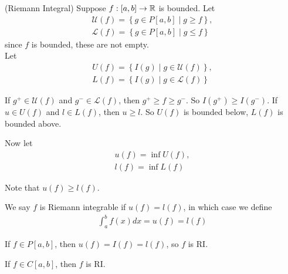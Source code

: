 \documentclass[a4paper]{article}
\begin{document}
\begin{defi} (Riemann Integral) Suppose $f:\left[a,b\right] \to \mathbb{R}$ is bounded. Let
\begin{equation*}
\begin{aligned}
\mathcal{U}\left(f\right) = \left\{ g\in P\left[a,b\right] \mid g\geq f\right\},\\
\mathcal{L}\left(f\right) = \left\{ g\in P\left[a,b\right] \mid g\leq f\right\}
\end{aligned}
\end{equation*}
since $f$ is bounded, these are not empty.\\
Let 
\begin{equation*}
\begin{aligned}
U\left(f\right) = \left\{I\left(g\right) \mid g \in \mathcal{U}\left(f\right)\right\},\\
L\left(f\right) = \left\{I\left(g\right) \mid g \in \mathcal{L}\left(f\right)\right\}
\end{aligned}
\end{equation*}

If $g^+ \in \mathcal{U}\left(f\right)$ and $g^- \in \mathcal{L}\left(f\right)$, then $g^+ \geq f \geq g^-$. So $I\left(g^+\right) \geq I\left(g^-\right)$. If $u \in U\left(f\right)$ and $l \in L\left(f\right)$, then $u \geq l$. So $U\left(f\right)$ is bounded below, $L\left(f\right)$ is bounded above.

Now let 
\begin{equation*}
\begin{aligned}
u\left(f\right) = \inf U\left(f\right),\\
l\left(f\right) = \inf L\left(f\right)
\end{aligned}
\end{equation*}

Note that $u\left(f\right) \geq l\left(f\right)$.

We say $f$ is Riemann integrable if $u\left(f\right) = l\left(f\right)$, in which case we define 
\begin{equation*}
\begin{aligned}
\int_a^b f\left(x\right) dx = u\left(f\right) = l\left(f\right)
\end{aligned}
\end{equation*}
\end{defi}

If $f \in P\left[a,b\right]$, then $u\left(f\right) = I\left(f\right) = l\left(f\right)$, so $f$ is RI.

\begin{thm}
If $f\in C\left[a,b\right]$, then $f$ is RI.
\end{thm}
\end{document}
